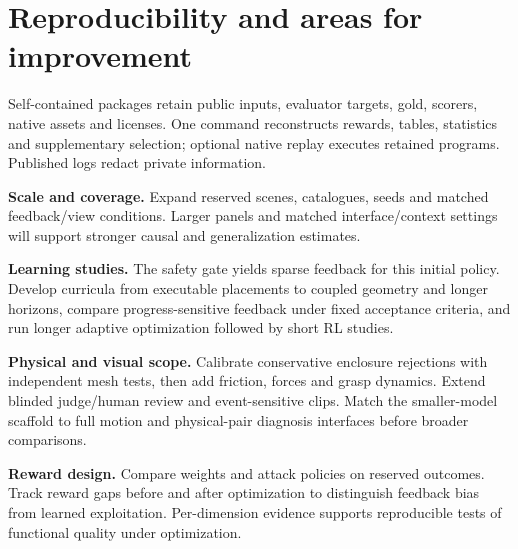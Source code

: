 \documentclass[10pt]{article}
\begin{document}
\section{Reproducibility and areas for improvement}
Self-contained packages retain public inputs, evaluator targets, gold, scorers, native assets and licenses. One command reconstructs rewards, tables, statistics and supplementary selection; optional native replay executes retained programs. Published logs redact private information.

\textbf{Scale and coverage.} Expand reserved scenes, catalogues, seeds and matched feedback/view conditions. Larger panels and matched interface/context settings will support stronger causal and generalization estimates.

\textbf{Learning studies.} The safety gate yields sparse feedback for this initial policy. Develop curricula from executable placements to coupled geometry and longer horizons, compare progress-sensitive feedback under fixed acceptance criteria, and run longer adaptive optimization followed by short RL studies. 

\textbf{Physical and visual scope.} Calibrate conservative enclosure rejections with independent mesh tests, then add friction, forces and grasp dynamics. Extend blinded judge/human review and event-sensitive clips. Match the smaller-model scaffold to full motion and physical-pair diagnosis interfaces before broader comparisons.

\textbf{Reward design.} Compare weights and attack policies on reserved outcomes. Track reward gaps before and after optimization to distinguish feedback bias from learned exploitation. Per-dimension evidence supports reproducible tests of functional quality under optimization.
\end{document}
